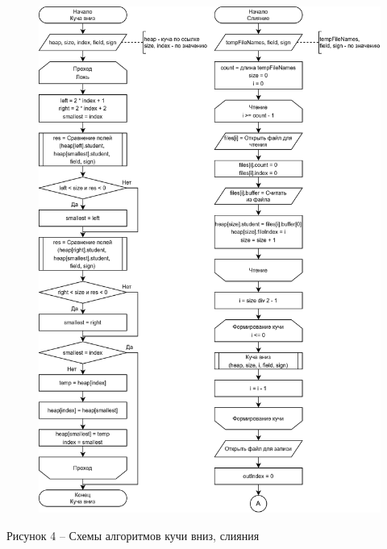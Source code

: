\documentclass[a4paper,14pt]{extarticle}
\begin{document}
  \begin{figure}[h]
    \centering
    \includegraphics[width=0.79\linewidth]{images/s-5}
  \end{figure}
  \begin{center}
    Рисунок 4 – Схемы алгоритмов кучи вниз, слияния
  \end{center}

  \pagebreak
\end{document}
